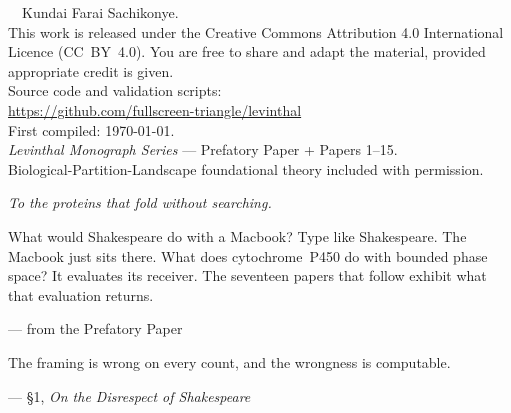 \documentclass[11pt,a4paper,openany,twoside]{book}
\theoremstyle{definition}
\theoremstyle{remark}
\begin{document}
\cleardoublepage

\thispagestyle{empty}
\vspace*{\fill}
\begin{small}
\noindent\textcopyright\ \the\year\ Kundai Farai Sachikonye.\\[1em]

\noindent This work is released under the Creative Commons
Attribution 4.0 International Licence (CC~BY~4.0).
You are free to share and adapt the material, provided
appropriate credit is given.\\[1em]

\noindent Source code and validation scripts:\\
\url{https://github.com/fullscreen-triangle/levinthal}\\[1em]

\noindent First compiled: \today.\\[1em]

\noindent \textit{Levinthal Monograph Series} — Prefatory Paper + Papers 1–15.\\
Biological-Partition-Landscape foundational theory included with permission.
\end{small}
\vspace{2cm}
\cleardoublepage

\thispagestyle{empty}
\vspace*{5cm}
\begin{center}
\itshape
To the proteins that fold without searching.
\end{center}
\cleardoublepage

\thispagestyle{empty}
\vspace*{4cm}
\epigraph{%
What would Shakespeare do with a Macbook?
Type like Shakespeare.
The Macbook just sits there.
What does cytochrome~P450 do with bounded phase space?
It evaluates its receiver.
The seventeen papers that follow exhibit what that evaluation returns.
}{--- from the Prefatory Paper}

\vspace{3em}
\epigraph{%
The framing is wrong on every count, and the wrongness is computable.
}{--- §1, \textit{On the Disrespect of Shakespeare}}
\end{document}
